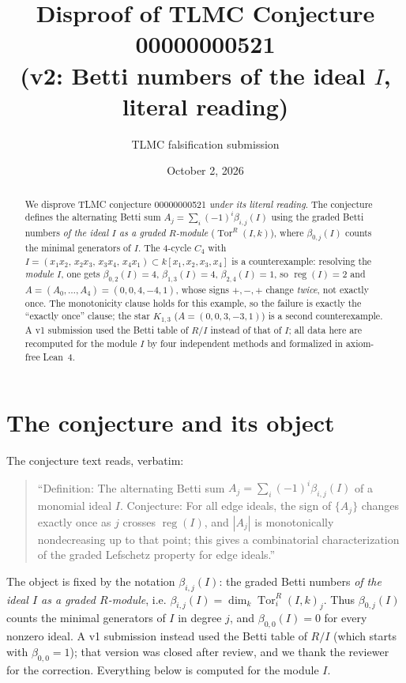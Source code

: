 \documentclass[11pt]{article}
\title{Disproof of TLMC Conjecture 00000000521\\
(v2: Betti numbers of the ideal $I$, literal reading)}
\author{TLMC falsification submission}
\date{October 2, 2026}
\begin{document}
\maketitle

\begin{abstract}
We disprove TLMC conjecture 00000000521 \emph{under its literal reading}.
The conjecture defines the alternating Betti sum
$A_j=\sum_i(-1)^i\beta_{i,j}(I)$ using the graded Betti numbers \emph{of the
ideal $I$ as a graded $R$-module} ($\operatorname{Tor}^R(I,k)$), where
$\beta_{0,j}(I)$ counts the minimal generators of $I$.  The 4-cycle
$C_4$ with $I=(x_1x_2,\,x_2x_3,\,x_3x_4,\,x_4x_1)\subset k[x_1,x_2,x_3,x_4]$
is a counterexample: resolving the \emph{module} $I$, one gets
$\beta_{0,2}(I)=4$, $\beta_{1,3}(I)=4$, $\beta_{2,4}(I)=1$, so
$\operatorname{reg}(I)=2$ and
$A=(A_0,\dots,A_4)=(0,0,4,-4,1)$, whose signs $+,-,+$ change
\emph{twice}, not exactly once.  The monotonicity clause holds for this
example, so the failure is exactly the ``exactly once'' clause; the star
$K_{1,3}$ ($A=(0,0,3,-3,1)$) is a second counterexample.  A v1 submission
used the Betti table of $R/I$ instead of that of $I$; all data here are
recomputed for the module $I$ by four independent methods and formalized in
axiom-free Lean~4.
\end{abstract}

\section{The conjecture and its object}

The conjecture text reads, verbatim:

\begin{quote}
``Definition: The alternating Betti sum $A_j=\sum_i(-1)^i\beta_{i,j}(I)$ of a
monomial ideal $I$.  Conjecture: For all edge ideals, the sign of
$\{A_j\}$ changes exactly once as $j$ crosses $\operatorname{reg}(I)$, and
$|A_j|$ is monotonically nondecreasing up to that point; this gives a
combinatorial characterization of the graded Lefschetz property for edge
ideals.''
\end{quote}

The object is fixed by the notation $\beta_{i,j}(I)$: the graded Betti
numbers \emph{of the ideal $I$ as a graded $R$-module}, i.e.
$\beta_{i,j}(I)=\dim_k\operatorname{Tor}_i^R(I,k)_j$.  Thus
$\beta_{0,j}(I)$ counts the minimal generators of $I$ in degree $j$, and
$\beta_{0,0}(I)=0$ for every nonzero ideal.  A v1 submission instead used
the Betti table of $R/I$ (which starts with $\beta_{0,0}=1$); that version
was closed after review, and we thank the reviewer for the correction.
Everything below is computed for the module $I$.
\end{document}
